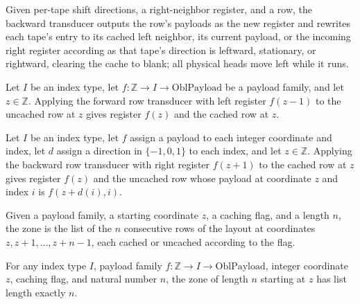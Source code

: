 \begin{definition}
\label{Complexity.payloadBackward}
\leanok
{}
Given per-tape shift directions, a right-neighbor register, and a row, the backward
transducer outputs the row's payloads as the new register and rewrites each tape's
entry to its cached left neighbor, its current payload, or the incoming right register
according as that tape's direction is leftward, stationary, or rightward, clearing the
cache to blank; all physical heads move left while it runs.
\end{definition}

\begin{lemma}
\label{Complexity.payloadForward_row}
\leanok
{}
Let $I$ be an index type, let $f:\mathbb Z\to I\to\mathrm{OblPayload}$ be a payload
family, and let $z\in\mathbb Z$. Applying the forward row transducer with left register
$f(z-1)$ to the uncached row at $z$ gives register $f(z)$ and the cached row at $z$.
\end{lemma}

\begin{lemma}
\label{Complexity.payloadBackward_row}
\leanok
{}
Let $I$ be an index type, let $f$ assign a payload to each integer coordinate and index,
let $d$ assign a direction in $\{-1,0,1\}$ to each index, and let $z\in\mathbb Z$.
Applying the backward row transducer with right register $f(z+1)$ to the cached row at
$z$ gives register $f(z)$ and the uncached row whose payload at coordinate $z$ and index
$i$ is $f(z+d(i),i)$.
\end{lemma}

\begin{definition}
\label{Complexity.payloadZone}
\leanok
{}
Given a payload family, a starting coordinate $z$, a caching flag, and a length $n$,
the zone is the list of the $n$ consecutive rows of the layout at coordinates
$z, z+1, \dots, z+n-1$, each cached or uncached according to the flag.
\end{definition}

\begin{lemma}
\label{Complexity.payloadZone_length}
\leanok
{}
For any index type $I$, payload family $f:\mathbb Z\to I\to\mathrm{OblPayload}$, integer
coordinate $z$, caching flag, and natural number $n$, the zone of length $n$ starting at
$z$ has list length exactly $n$.
\end{lemma}

